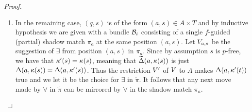 \begin{proof}
\begin{enumerate}[label = (\Alph*), ref = \Alph*]
\begin{enumerate}[label = (\roman*), ref = \roman*]
  \end{enumerate}
  \item In the remaining case, $(q,s)$ is of the form $(a,s) \in A \times T$ and by inductive hypothesis we are given with a bundle $\mathcal{B}_i$ consisting of a single $f$-guided (partial) shadow match $\pi_a$ at the same position $(a,s)$. Let $V_{a,s}$ be the suggestion of $\exists$ from position $(a,s)$ in $\pi_a$. Since by assumption $s$ is $p$-free, we have that $\kappa'(s) = \kappa(s)$, meaning that $\widetilde{\Delta}(a,\kappa(s))$ is just $\Delta(a,\kappa(s)) = \Delta(a,\kappa'(s))$. Thus the restriction $V'$ of $V$ to $A$ makes $\Delta(a,\kappa'(t))$ true and we let it be the choice for $\exists$ in $\tilde{\pi}$. It follows that any next move made by $\forall$ in $\tilde{\pi}$ can be mirrored by $\forall$ in the shadow match $\pi_a$.
      \begin{comment}Version with minimality:
      It follows that $\DeltaProj(a,\tscolors(t))$ is just $\Delta(a,\tscolors(t)) = \Delta(a,\tscolors'(t))$ and the same valuation suggested by $f$ in $\pi_a$ is a legitimate choice for $\exists$ in $\tilde{\pi}$. By letting $\exists$ choose such valuation, it follows that any next move made by $\forall$ in $\tilde{\pi}$ can be mirrored by $\forall$ in the shadow match $\pi_a$.
      \end{comment}
\end{enumerate}



\end{proof}

